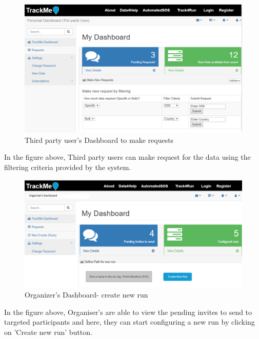 \documentclass[a4paper, hidelinks, 12pt]{report}
\begin{document}
	\begin{figure}[H]
		\centering
		\includegraphics[scale=0.35]{../Assets/Make_Request.png}\caption[UI: Third party user's Dashboard to make requests]{Third party user's Dashboard to make requests}
		\label{fig:Make_Request}
	\end{figure}
	
	In the figure above, Third party users can make request for the data using the filtering criteria provided by the system.
	
	\begin{figure}[H]
		\centering
		\includegraphics[scale=0.35]{../Assets/organizer_dashboard_1.png}\caption[UI: Organiser's Dashboard - create new run]{Organizer's Dashboard- create new run}
		\label{fig:Make_Request}
	\end{figure}
	In the figure above, Organiser's are able to view the pending invites to send to targeted participants and here, they can start configuring a new run by clicking on 'Create new run' button.
	
\end{document}
